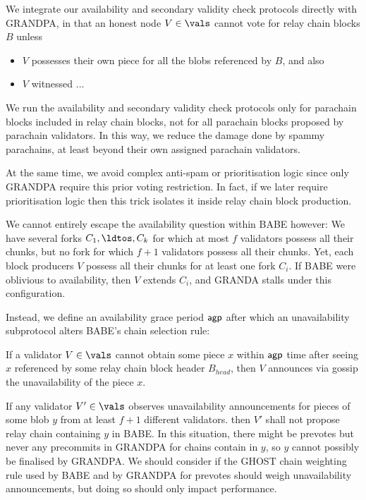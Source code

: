 We integrate our availability and secondary validity check protocols directly with GRANDPA, in that an honest node $V \in \vals$ cannot vote for relay chain blocks $B$ unless
\begin{itemize}
\item $V$ possesses their own piece for all the blobs referenced by $B$, and also
\item $V$ witnessed ... 
\end{itemize}

We run the availability and secondary validity check protocols only for parachain blocks included in relay chain blocks, not for all parachain blocks proposed by parachain validators.  In this way, we reduce the damage done by spammy parachains, at least beyond their own assigned parachain validators.

At the same time, we avoid complex anti-spam or prioritisation logic since only GRANDPA require this prior voting restriction.  In fact, if we later require prioritisation logic then this trick isolates it inside relay chain block production.

We cannot entirely escape the availability question within BABE however:  We have several forks $C_1,\ldtos,C_k$ for which at most $f$ validators possess all their chunks, but no fork for which $f+1$ validators possess all their chunks.  Yet, each block producers $V$ possess all their chunks for at least one fork $C_i$.  If BABE were oblivious to availability, then $V$ extends $C_i$, and GRANDA stalls under this configuration. 

Instead, we define an availability grace period $\mathsf{agp}$ after which an unavailability subprotocol alters BABE's chain selection rule:  

If a validator $V \in \vals$ cannot obtain some piece $x$ within $\mathsf{agp}$ time after seeing $x$ referenced by some relay chain block header $B_{head}$, then $V$ announces via gossip the unavailability of the piece $x$. 

If any validator $V' \in \vals$ observes unavailability announcements for pieces of some blob $y$ from at least $f+1$ different validators. then $V'$ shall not propose relay chain containing $y$ in BABE.
In this situation, there might be prevotes but never any precommits in GRANDPA for chains contain in $y$, so $y$ cannot possibly be finalised by GRANDPA.  We should consider if the GHOST chain weighting rule used by BABE and by GRANDPA for prevotes should weigh unavailability announcements, but doing so should only impact performance.


